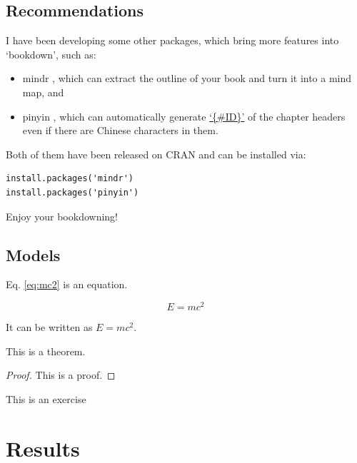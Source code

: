 \documentclass[]{book}
\theoremstyle{definition}
\theoremstyle{definition}
\theoremstyle{definition}
\theoremstyle{remark}
\let\BeginKnitrBlock\begin \let\EndKnitrBlock\end
\begin{document}
\subsection{Recommendations}\label{recommendations}

I have been developing some other packages, which bring more features
into `bookdown', such as:

\begin{itemize}
\item
  mindr \citep{R-mindr}, which can extract the outline of your book and
  turn it into a mind map, and
\item
  pinyin \citep{R-pinyin}, which can automatically generate
  \href{https://bookdown.org/yihui/bookdown/cross-references.html}{`\{\#ID\}'}
  of the chapter headers even if there are Chinese characters in them.
\end{itemize}

Both of them have been released on CRAN and can be installed via:

\begin{verbatim}
install.packages('mindr')
install.packages('pinyin')
\end{verbatim}

Enjoy your bookdowning!

\subsection{Models}\label{models}

Eq. \eqref{eq:mc2} is an equation.

\begin{equation} 
E = mc^2
  \label{eq:mc2}
\end{equation}

It can be written as \(E = mc^2\).

\BeginKnitrBlock{theorem}
\protect\hypertarget{thm:lik}{}{\label{thm:lik} }This is a theorem.
\EndKnitrBlock{theorem} \BeginKnitrBlock{proof}

{}This is a proof.
\EndKnitrBlock{proof}

\BeginKnitrBlock{exercise}
\protect\hypertarget{exr:unnamed-chunk-17}{}{\label{exr:unnamed-chunk-17}
}This is an exercise
\EndKnitrBlock{exercise}

\section{Results}\label{results}
\end{document}
